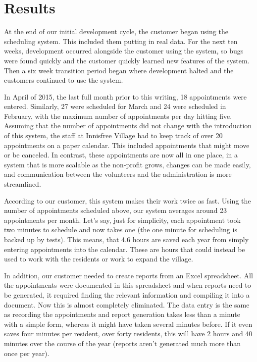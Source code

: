 \documentclass{sig-alternate}
\begin{document}
\section{Results}
At the end of our initial development cycle, the customer began using the scheduling system. This included them putting in real data. For the next ten weeks, development occurred alongside the customer using the system, so bugs were found quickly and the customer quickly learned new features of the system. Then a six week transition period began where development halted and the customers continued to use the system.

In April of 2015, the last full month prior to this writing, 18 appointments were entered. Similarly, 27 were scheduled for March and 24 were scheduled in February, with the maximum number of appointments per day hitting five. Assuming that the number of appointments did not change with the introduction of this system, the staff at Innisfree Village had to keep track of over 20 appointments on a paper calendar. This included appointments that might move or be canceled. In contrast, these appointments are now all in one place, in a system that is more scalable as the non-profit grows, changes can be made easily, and communication between the volunteers and the administration is more streamlined.

According to our customer, this system makes their work twice as fast. Using the number of appointments scheduled above, our system averages around 23 appointments per month. Let's say, just for simplicity, each appointment took two minutes to schedule and now takes one (the one minute for scheduling is backed up by tests). This means, that 4.6 hours are saved each year from simply entering appointments into the calendar. These are hours that could instead be used to work with the residents or work to expand the village.

In addition, our customer needed to create reports from an Excel spreadsheet. All the appointments were documented in this spreadsheet and when reports need to be generated, it required finding the relevant information and compiling it into a document. Now this is almost completely eliminated. The data entry is the same as recording the appointments and report generation takes less than a minute with a simple form, whereas it might have taken several minutes before. If it even saves four minutes per resident, over forty residents, this will have 2 hours and 40 minutes over the course of the year (reports aren't generated much more than once per year). 
\end{document}
